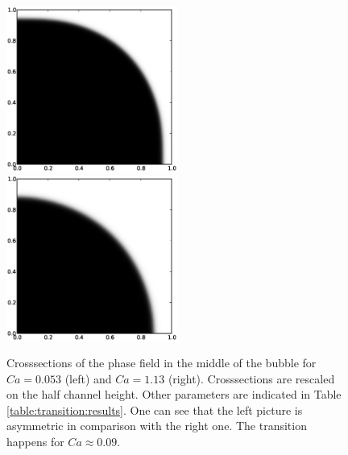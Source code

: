 \documentclass{article}
\begin{document}
\begin{figure}[ht]
\includegraphics[width=0.5\textwidth]{Figures/phase_crossection_ca5.eps}
\includegraphics[width=0.5\textwidth]{Figures/phase_crossection_ca13.eps}\\
\caption{Crosssections of the phase field in the middle of the bubble for $Ca=0.053$
(left) and $Ca=1.13$ (right). Crosssections are rescaled on the half channel height. Other
parameters are indicated in Table \ref{table:transition:results}. One can see that the left picture
is asymmetric in comparison
with the right one. The transition happens for $Ca\approx 0.09$.\label{fig:crosssections:sym}}
\end{figure}
\end{document}
